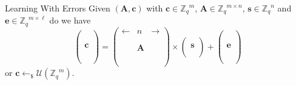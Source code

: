 \documentclass[10pt,compress]{beamer}
\renewcommand{\vec}[1]{\mathbf{#1}\xspace}
\newcommand{\Zq}{\ensuremath{\Z_q}\xspace}
\newcommand{\Udist}[1]{\ensuremath{\mathcal{U}(#1)\xspace}}
\renewcommand{\vec}[1]{\mathbf{#1}\xspace}
\newcommand{\Z}{\ensuremath{\mathbb{Z}}\xspace}
\newcommand{\sample}{\ensuremath{\leftarrow_{\$}}}
\begin{document}
\begin{frame}{Learning With Errors}
  Given $(\vec{A},\vec{c})$ with $\vec{c} \in \Zq^{m}$, $\vec{A} \in \Zq^{m \times n}$, $\vec{s} \in \Zq^{n}$ and $\vec{e} \in \Zq^{m \times \ell}$ do we have
  \[
    \left(\begin{array}{c}
            \\
            \\
            \\ 
            \vec{c} \\
            \\
            \\
            \\\end{array} 
        \right) = 
        \left(\begin{array}{ccc}
                \leftarrow & n & \rightarrow \\
                \\
                \\ 
                           & \vec{A} & \\
                \\
                \\
                \\
              \end{array} \right) 
            \times 
            \left(\begin{array}{c}
                    \\ 
                    \vec{s} \\
                    \\
                  \end{array}\right) 
                + \left(\begin{array}{c}
                          \\
                          \\
                          \\ 
                          \vec{e} \\
                          \\
                          \\
                          \\
                        \end{array}\right)
  \]
  or $\vec{c} \sample \Udist{\Zq^{m}}$.
\end{frame}
\end{document}

